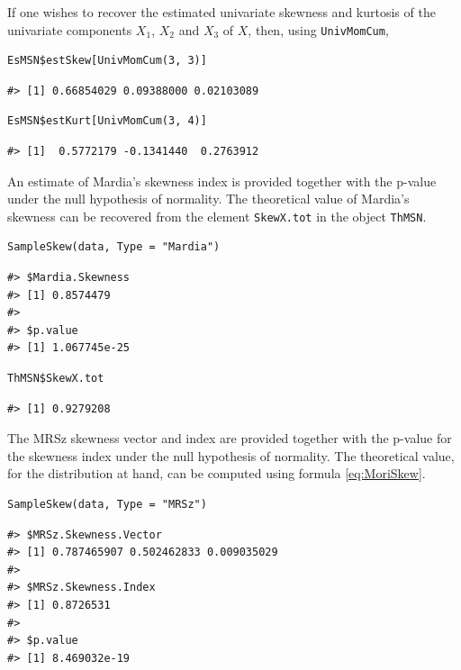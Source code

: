 If one wishes to recover the estimated univariate skewness and kurtosis of the univariate components \(X_1\), \(X_2\) and \(X_3\) of \(X\), then, using \texttt{UnivMomCum},

\begin{verbatim}
EsMSN$estSkew[UnivMomCum(3, 3)]
\end{verbatim}

\begin{verbatim}
#> [1] 0.66854029 0.09388000 0.02103089
\end{verbatim}

\begin{verbatim}
EsMSN$estKurt[UnivMomCum(3, 4)] 
\end{verbatim}

\begin{verbatim}
#> [1]  0.5772179 -0.1341440  0.2763912
\end{verbatim}

An estimate of Mardia's skewness index is provided together with the p-value under the null hypothesis of normality. The theoretical value of Mardia's skewness can be recovered from the element \texttt{SkewX.tot} in the object \texttt{ThMSN}.

\begin{verbatim}
SampleSkew(data, Type = "Mardia")
\end{verbatim}

\begin{verbatim}
#> $Mardia.Skewness
#> [1] 0.8574479
#> 
#> $p.value
#> [1] 1.067745e-25
\end{verbatim}

\begin{verbatim}
ThMSN$SkewX.tot
\end{verbatim}

\begin{verbatim}
#> [1] 0.9279208
\end{verbatim}

The MRSz skewness vector and index are provided together with the p-value for the skewness index under the null hypothesis of normality. The theoretical value, for the distribution at hand, can be computed using formula \eqref{eq:MoriSkew}.

\begin{verbatim}
SampleSkew(data, Type = "MRSz")
\end{verbatim}

\begin{verbatim}
#> $MRSz.Skewness.Vector
#> [1] 0.787465907 0.502462833 0.009035029
#> 
#> $MRSz.Skewness.Index
#> [1] 0.8726531
#> 
#> $p.value
#> [1] 8.469032e-19
\end{verbatim}

